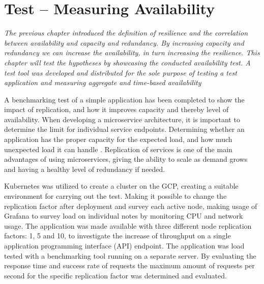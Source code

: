 \chapter{Test -- Measuring Availability}
\label{ch:experiment}

\textit{The previous chapter introduced the definition of resilience and the correlation between availability and capacity and redundancy. By increasing capacity and redundancy we can increase the availability, in turn increasing the resilience. This chapter will test the hypotheses by showcasing the conducted availability test. A test tool was developed and distributed for the sole purpose of testing a test application and measuring aggregate and time-based availability}

A benchmarking test of a simple application has been completed to show the impact of replication, and how it improves capacity and thereby level of availability. When developing a microservice architecture, it is important to determine the limit for individual service endpoints. Determining whether an application has the proper capacity for the expected load, and how much unexpected load it can handle \cite[p.~159]{beyer2016siteReliabilityEngineering}. Replication of services is one of the main advantages of using microservices, giving the ability to scale as demand grows and having a healthy level of redundancy if needed. 

Kubernetes was utilized to create a cluster on the GCP, creating a suitable environment for carrying out the test. Making it possible to change the replication factor after deployment and survey each active node, making usage of Grafana to survey load on individual notes by monitoring CPU and network usage. The application was made available with three different node replication factors: 1,  5 and 10, to investigate the increase of throughput on a single application programming interface (API) endpoint. 
The application was load tested with a benchmarking tool running on a separate server. By evaluating the response time and success rate of requests the maximum amount of requests per second for the specific replication factor was determined and evaluated.



